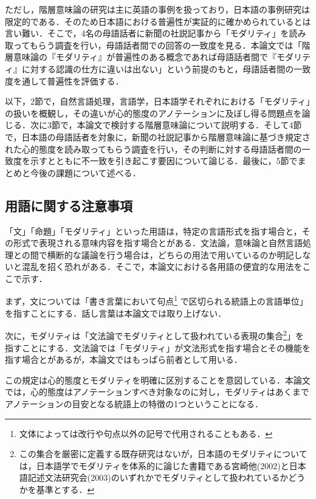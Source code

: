 \documentclass[japanese]{jnlp_1.4}
\begin{document}
ただし，階層意味論の研究は主に英語の事例を扱っており，日本語の事例研究は限定的である．そのため日本語における普遍性が実証的に確かめられているとは言い難い．そこで，4名の母語話者に新聞の社説記事から「モダリティ」を読み取ってもらう調査を行い，母語話者間での回答の一致度を見る．本論文では「階層意味論の『モダリティ』が普遍性のある概念であれば母語話者間で『モダリティ』に対する認識の仕方に違いは出ない」という前提のもと，母語話者間の一致度を通して普遍性を評価する．

以下，2節で，自然言語処理，言語学，日本語学それぞれにおける「モダリティ」の扱いを概観し，その違いが心的態度のアノテーションに及ぼし得る問題点を論じる．次に3節で，本論文で検討する階層意味論について説明する．そして4節で，日本語の母語話者を対象に，新聞の社説記事から階層意味論に基づき規定された心的態度を読み取ってもらう調査を行い，その判断に対する母語話者間の一致度を示すとともに不一致を引き起こす要因について論じる．最後に，5節でまとめと今後の課題について述べる．


\vspace{-0.5\baselineskip}
\subsection{用語に関する注意事項}

「文」「命題」「モダリティ」といった用語は，特定の言語形式を指す場合と，その形式で表現される意味内容を指す場合とがある．文法論，意味論と自然言語処理との間で横断的な議論を行う場合は，どちらの用法で用いているのか明記しないと混乱を招く恐れがある．そこで，本論文における各用語の便宜的な用法をここで示す．

まず，文については「書き言葉において句点\footnote{文体によっては改行や句点以外の記号で代用されることもある．} で区切られる統語上の言語単位」を指すことにする．話し言葉は本論文では取り上げない．

次に，モダリティは「文法論でモダリティとして扱われている表現の集合\footnote{この集合を厳密に定義する既存研究はないが，日本語のモダリティについては，日本語学でモダリティを体系的に論じた書籍である宮崎他(2002)と日本語記述文法研究会(2003)のいずれかでモダリティとして扱われているかどうかを基準とする．}」を指すことにする．文法論では「モダリティ」が文法形式を指す場合とその機能を指す場合とがあるが，本論文ではもっぱら前者として用いる．

この規定は心的態度とモダリティを明確に区別することを意図している．本論文では，心的態度はアノテーションすべき対象なのに対し，モダリティはあくまでアノテーションの目安となる統語上の特徴の1つということになる．
\end{document}

